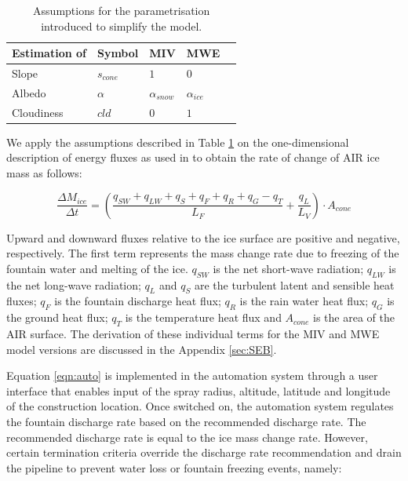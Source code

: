 \documentclass[tc, manuscript]{copernicus}
\begin{document}
\begin{table}[]
\centering
\caption{Assumptions for the parametrisation introduced to simplify the model.}
\label{tab:assumptions}
\begin{tabular}{@{}lllll@{}}
\toprule
\textbf{Estimation of} & \textbf{Symbol} & \textbf{MIV} & \textbf{MWE} & \\ \midrule
\multicolumn{1}{|l}{Slope}        & $s_{cone}$ & $ 1 $ & $0$ & \multicolumn{1}{l|}{} \\ \midrule
\multicolumn{1}{|l}{Albedo} & $\alpha$ & $\alpha_{snow}$ & $\alpha_{ice}$ & \multicolumn{1}{l|}{} \\\midrule 
\multicolumn{1}{|l}{Cloudiness}  & $cld$ & $0$ & $1$ & \multicolumn{1}{l|}{} \\ \bottomrule
\end{tabular}
\end{table}

We apply the assumptions described in Table \ref{tab:assumptions} on the one-dimensional description of energy
fluxes as used in \cite{balasubramanianInfluenceMeteorologicalConditions2022} to obtain the rate of change of
AIR ice mass as follows: 

\begin{equation}
  \frac{\Delta M_{ice}}{\Delta t}  =  (\frac{q_{SW} + q_{LW} + q_{S} + q_{F} + q_{R} + q_{G} - q_{T}}{L_F} + \frac{q_{L}}{L_V} ) \cdot A_{cone}
	\label{eqn:auto}
\end{equation}

Upward and downward fluxes relative to the ice surface are positive and negative, respectively. The first term
represents the mass change rate due to freezing of the fountain water and melting of the ice. $q_{SW}$ is the
net short-wave radiation; $q_{LW}$ is the net long-wave radiation; $q_{L}$ and $q_{S}$ are the turbulent latent
and sensible heat fluxes; $q_{F}$ is the fountain discharge heat flux; $q_{R}$ is the rain water heat flux;
$q_{G}$ is the ground heat flux; $q_{T}$ is the temperature heat flux and $A_{cone}$ is the area of the AIR
surface. The derivation of these individual terms for the MIV and MWE model versions are discussed in the
Appendix \ref{sec:SEB}.

Equation \ref{eqn:auto} is implemented in the automation system through a user interface that enables input of
the spray radius, altitude, latitude and longitude of the construction location. Once switched on, the
automation system regulates the fountain discharge rate based on the recommended discharge rate. The recommended
discharge rate is equal to the ice mass change rate. However, certain termination criteria override the
discharge rate recommendation and drain the pipeline to prevent water loss or fountain freezing events, namely: 
\end{document}

